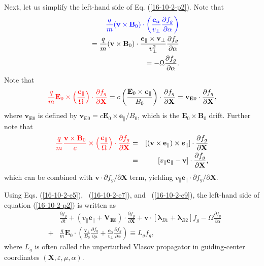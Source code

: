 \documentclass{article}
\newcommand{\tmcolor}[2]{{\color{#1}{#2}}}
\newcommand{\tmmathbf}[1]{\ensuremath{\boldsymbol{#1}}}
\begin{document}
Next, let us simplify the left-hand side of Eq. (\ref{16-10-2-p2}). Note that
\begin{eqnarray}
  &  & \tmcolor{blue}{\frac{q}{m}  (\mathbf{v} \times \mathbf{B}_0) \cdot
  \left( \frac{\mathbf{e}_{\alpha}}{v_{\perp}}  \frac{\partial f_g}{\partial
  \alpha} \right)} \nonumber\\
  &  & = \frac{q}{m}  (\mathbf{v} \times \mathbf{B}_0) \cdot
  \frac{\tmmathbf{e}_{\parallel} \times \mathbf{v}_{\perp}}{v_{\perp}^2} 
  \frac{\partial f_g}{\partial \alpha} \nonumber\\
  &  & = - \Omega \frac{\partial f_g}{\partial \alpha} .  \label{16-10-2-e9}
\end{eqnarray}
Note that
\begin{equation}
  \label{16-10-2-e5} \tmcolor{red}{\frac{q}{m} \mathbf{E}_0 \times \left(
  \frac{\tmmathbf{e}_{\parallel}}{\Omega}  \right) \cdot \frac{\partial
  f_g}{\partial \mathbf{X}}} = c \left( \frac{\mathbf{E}_0 \times
  \tmmathbf{e}_{\parallel}}{B_0}  \right) \cdot \frac{\partial f_g}{\partial
  \mathbf{X}} =\mathbf{v}_{\mathbf{E}0} \cdot \frac{\partial f_g}{\partial
  \mathbf{X}},
\end{equation}
where $\mathbf{v}_{\mathbf{E}0}$ is defined by $\mathbf{v}_{\mathbf{E}0} =
c\mathbf{E}_0 \times \mathbf{e}_{\parallel} / B_0$, which is the $\mathbf{E}_0
\times \mathbf{B}_0$ drift. Further note that
\begin{eqnarray}
  \tmcolor{red}{\frac{q}{m}  \frac{\mathbf{v} \times \mathbf{B}_0}{c} \times
  \left( \frac{\tmmathbf{e}_{\parallel}}{\Omega}  \right) \cdot \frac{\partial
  f_g}{\partial \mathbf{X}}} & = & [(\mathbf{v} \times \mathbf{e}_{\parallel})
  \times \tmmathbf{e}_{\parallel}] \cdot \frac{\partial f_g}{\partial
  \mathbf{X}} \nonumber\\
  & = & [v_{\parallel} \mathbf{e}_{\parallel} -\mathbf{v}] \cdot
  \frac{\partial f_g}{\partial \mathbf{X}},  \label{16-10-2-e7}
\end{eqnarray}
which can be combined with $\mathbf{v} \cdot \partial f_g / \partial
\mathbf{X}$ term, yielding $v_{\parallel} \mathbf{e}_{\parallel} \cdot
\partial f_g / \partial \mathbf{X}$.

Using Eqs. (\ref{16-10-2-e5}), \ (\ref{16-10-2-e7}), and \
(\ref{16-10-2-e9}), the left-hand side of equation (\ref{16-10-2-p2}) is
written as
\begin{eqnarray}
  &  & \frac{\partial f_g}{\partial t} + (v_{\parallel}
  \mathbf{e}_{\parallel} +\mathbf{V}_{\mathbf{E}0}) \cdot \frac{\partial
  f_g}{\partial \mathbf{X}} +\mathbf{v} \cdot [\tmmathbf{\lambda}_{B 1}
  +\tmmathbf{\lambda}_{B 2}] f_g - \Omega \frac{\partial f_g}{\partial \alpha}
  \nonumber\\
  & + & \frac{q}{m} \mathbf{E}_0 \cdot \left( \frac{\mathbf{v}_{\perp}}{B_0} 
  \frac{\partial f_g}{\partial \mu} + \frac{\tmmathbf{e}_{\alpha}}{v_{\perp}} 
  \frac{\partial f_g}{\partial \alpha} \right) \equiv L_g f_g, 
  \label{16-9-22-1b}
\end{eqnarray}
where $L_g$ is often called the unperturbed Vlasov propagator in
guiding-center coordinates $(\mathbf{X}, \varepsilon, \mu, \alpha)$.
\end{document}
